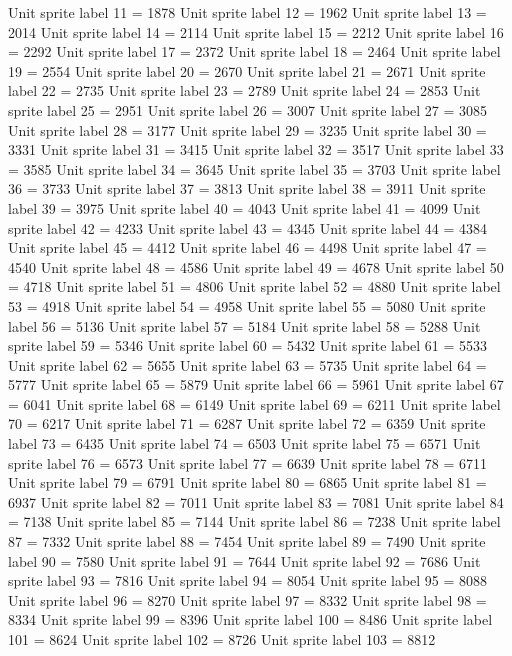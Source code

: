 Unit sprite label 11 = 1878
Unit sprite label 12 = 1962
Unit sprite label 13 = 2014
Unit sprite label 14 = 2114
Unit sprite label 15 = 2212
Unit sprite label 16 = 2292
Unit sprite label 17 = 2372
Unit sprite label 18 = 2464
Unit sprite label 19 = 2554
Unit sprite label 20 = 2670
Unit sprite label 21 = 2671
Unit sprite label 22 = 2735
Unit sprite label 23 = 2789
Unit sprite label 24 = 2853
Unit sprite label 25 = 2951
Unit sprite label 26 = 3007
Unit sprite label 27 = 3085
Unit sprite label 28 = 3177
Unit sprite label 29 = 3235
Unit sprite label 30 = 3331
Unit sprite label 31 = 3415
Unit sprite label 32 = 3517
Unit sprite label 33 = 3585
Unit sprite label 34 = 3645
Unit sprite label 35 = 3703
Unit sprite label 36 = 3733
Unit sprite label 37 = 3813
Unit sprite label 38 = 3911
Unit sprite label 39 = 3975
Unit sprite label 40 = 4043
Unit sprite label 41 = 4099
Unit sprite label 42 = 4233
Unit sprite label 43 = 4345
Unit sprite label 44 = 4384
Unit sprite label 45 = 4412
Unit sprite label 46 = 4498
Unit sprite label 47 = 4540
Unit sprite label 48 = 4586
Unit sprite label 49 = 4678
Unit sprite label 50 = 4718
Unit sprite label 51 = 4806
Unit sprite label 52 = 4880
Unit sprite label 53 = 4918
Unit sprite label 54 = 4958
Unit sprite label 55 = 5080
Unit sprite label 56 = 5136
Unit sprite label 57 = 5184
Unit sprite label 58 = 5288
Unit sprite label 59 = 5346
Unit sprite label 60 = 5432
Unit sprite label 61 = 5533
Unit sprite label 62 = 5655
Unit sprite label 63 = 5735
Unit sprite label 64 = 5777
Unit sprite label 65 = 5879
Unit sprite label 66 = 5961
Unit sprite label 67 = 6041
Unit sprite label 68 = 6149
Unit sprite label 69 = 6211
Unit sprite label 70 = 6217
Unit sprite label 71 = 6287
Unit sprite label 72 = 6359
Unit sprite label 73 = 6435
Unit sprite label 74 = 6503
Unit sprite label 75 = 6571
Unit sprite label 76 = 6573
Unit sprite label 77 = 6639
Unit sprite label 78 = 6711
Unit sprite label 79 = 6791
Unit sprite label 80 = 6865
Unit sprite label 81 = 6937
Unit sprite label 82 = 7011
Unit sprite label 83 = 7081
Unit sprite label 84 = 7138
Unit sprite label 85 = 7144
Unit sprite label 86 = 7238
Unit sprite label 87 = 7332
Unit sprite label 88 = 7454
Unit sprite label 89 = 7490
Unit sprite label 90 = 7580
Unit sprite label 91 = 7644
Unit sprite label 92 = 7686
Unit sprite label 93 = 7816
Unit sprite label 94 = 8054
Unit sprite label 95 = 8088
Unit sprite label 96 = 8270
Unit sprite label 97 = 8332
Unit sprite label 98 = 8334
Unit sprite label 99 = 8396
Unit sprite label 100 = 8486
Unit sprite label 101 = 8624
Unit sprite label 102 = 8726
Unit sprite label 103 = 8812

